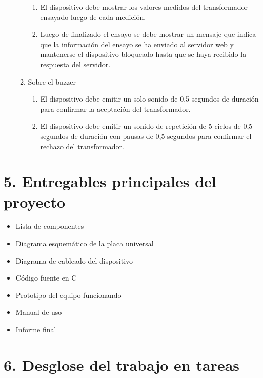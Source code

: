 \documentclass[11pt]{charter}
\begin{document}
\begin{enumerate}
\begin{enumerate}
\begin{enumerate}
		\item El dispositivo debe mostrar los valores medidos del transformador ensayado luego de cada medición.
		\item Luego de finalizado el ensayo se debe mostrar un mensaje que indica que la información del ensayo se ha enviado al servidor web y mantenerse el dispositivo bloqueado hasta que se haya recibido la respuesta del servidor.
		\end{enumerate}
	\item Sobre el buzzer
		\begin{enumerate}
		\item El dispositivo debe emitir un solo sonido de 0,5 segundos de duración para confirmar la aceptación del transformador.
		\item El dispositivo debe emitir un sonido de repetición de 5 ciclos de 0,5 segundos de duración con pausas de 0,5 segundos para confirmar el rechazo del transformador.
		\end{enumerate}		
	\end{enumerate}
\end{enumerate}





\section{5. Entregables principales del proyecto}
\label{sec:entregables}


\begin{itemize}
\item Lista de componentes
\item Diagrama esquemático de la placa universal
\item Diagrama de cableado del dispositivo
\item Código fuente en C
\item Prototipo del equipo funcionando
\item Manual de uso
\item Informe final
\end{itemize}



\section{6. Desglose del trabajo en tareas}
\label{sec:wbs}
\end{document}
